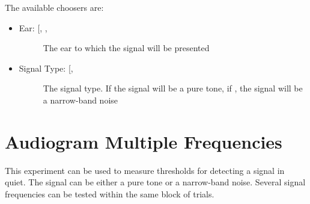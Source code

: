 \documentclass[a4paper,12pt,english]{sphinxmanual}
\begin{document}
The available choosers are:
\begin{itemize}
\item {} \begin{description}
\item[{Ear: {[}, , \code{Both}{]}}] \leavevmode
The ear to which the signal will be presented

\end{description}

\item {} \begin{description}
\item[{Signal Type: {[}, \code{Narrowband Noise}{]}}] \leavevmode
The signal type. If  the signal will be a pure tone, if , the signal will be a narrow-band noise

\end{description}

\end{itemize}


\section{Audiogram Multiple Frequencies}
\label{default_experiments:audiogram-multiple-frequencies}\label{default_experiments:module-pychoacoustics.default_experiments.audiogram_mf}
This experiment can be used to measure thresholds for detecting a signal in quiet.
The signal can be either a pure tone or a narrow-band noise. Several signal frequencies
can be tested within the same block of trials.
\end{document}
